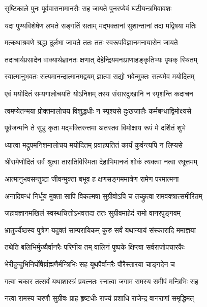 \twolineshloka
{सृष्टिकाले पुनः पूर्ववासनामानसैः सह}
{जायते पुनरप्येवं घटीयन्त्रमिवावशः} %

\twolineshloka
{यदा पुण्यविशेषेण लभते सङ्गतिं सताम्}
{मद्भक्तानां सुशान्तानां तदा मद्विषया मतिः} %

\twolineshloka
{मत्कथाश्रवणे श्रद्धा दुर्लभा जायते ततः}
{ततः स्वरूपविज्ञानमनायासेन जायते} %

\twolineshloka
{तदाचार्यप्रसादेन वाक्यार्थज्ञानतः क्षणात्}
{देहेन्द्रियमनःप्राणाहङ्कृतिभ्यः पृथक् स्थितम्} %

\twolineshloka
{स्वात्मानुभवतः सत्यमानन्दात्मानमद्वयम्}
{ज्ञात्वा सद्यो भवेन्मुक्तः सत्यमेव मयोदितम्} %

\twolineshloka
{एवं मयोदितं सम्यगालोचयति योऽनिशम्}
{तस्य संसारदुःखानि न स्पृशन्ति कदाचन} %

\twolineshloka
{त्वमप्येतन्मया प्रोक्तमालोचय विशुद्धधीः}
{न स्पृश्यसे दुःखजालैः कर्मबन्धाद्विमोक्ष्यसे} %

\twolineshloka
{पूर्वजन्मनि ते सुभ्रु कृता मद्भक्तिरुत्तमा}
{अतस्तव विमोक्षाय रूपं मे दर्शितं शुभे} %

\twolineshloka
{ध्यात्वा मद्रूपमनिशमालोचय मयोदितम्}
{प्रवाहपतितं कार्यं कुर्वन्त्यपि न लिप्यसे} %

\twolineshloka
{श्रीरामेणोदितं सर्वं श्रुत्वा तारातिविस्मिता}
{देहाभिमानजं शोकं त्यक्त्वा नत्वा रघूत्तमम्} %

\twolineshloka
{आत्मानुभवसन्तुष्टा जीवन्मुक्ता बभूव ह}
{क्षणसङ्गममात्रेण रामेण परमात्मना} %

\twolineshloka
{अनादिबन्धं निर्धूय मुक्ता सापि विकल्मषा}
{सुग्रीवोऽपि च तच्छ्रुत्वा रामवक्त्रात्समीरितम्} %

\twolineshloka
{जहावज्ञानमखिलं स्वस्थचित्तोऽभवत्तदा}
{ततः सुग्रीवमाहेदं रामो वानरपुङ्गवम्} %

\twolineshloka
{भ्रातुर्ज्येष्ठस्य पुत्रेण यदुक्तं साम्परायिकम्}
{कुरु सर्वं यथान्यायं संस्कारादि ममाज्ञया} %

\twolineshloka
{तथेति बलिभिर्मुख्यैर्वानरैः परिणीय तम्}
{वालिनं पुष्पके क्षिप्त्वा सर्वराजोपचारकैः} %

\twolineshloka
{भेरीदुन्दुभिनिर्घोषैर्ब्राह्मणैर्मन्त्रिभिः सह}
{यूथपैर्वानरैः पौरैस्तारया चाङ्गदेन च} %

\twolineshloka
{गत्वा चकार तत्सर्वं यथाशास्त्रं प्रयत्नतः}
{स्नात्वा जगाम रामस्य समीपं मन्त्रिभिः सह} %

\twolineshloka
{नत्वा रामस्य चरणौ सुग्रीवः प्राह हृष्टधीः}
{राज्यं प्रशाधि राजेन्द्र वानराणां समृद्धिमत्} %

